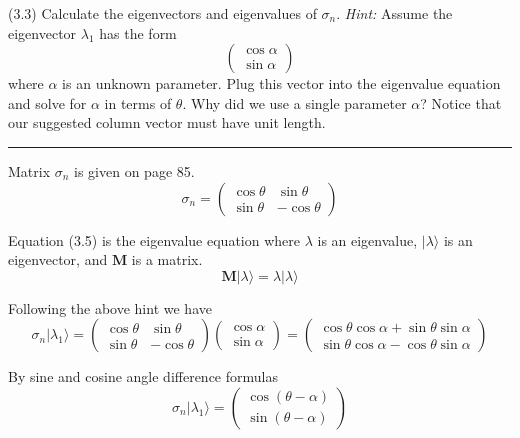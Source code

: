 \documentclass[12pt]{article}
\begin{document}
(3.3)
Calculate the eigenvectors and eigenvalues of $\sigma_n$.
{\it Hint:}
Assume the eigenvector $\lambda_1$ has the form
\begin{equation*}
\begin{pmatrix}\cos\alpha\\\sin\alpha\end{pmatrix}
\end{equation*}
where $\alpha$ is an unknown parameter.
Plug this vector into the eigenvalue equation and
solve for $\alpha$ in terms of $\theta$.
Why did we use a single parameter $\alpha$?
Notice that our suggested column vector must have unit length.

\bigskip
\hrule

\bigskip
Matrix $\sigma_n$ is given on page 85.
\begin{equation*}
\sigma_n=\begin{pmatrix}
\cos\theta & \sin\theta
\\
\sin\theta & -\cos\theta
\end{pmatrix}
\end{equation*}

Equation (3.5) is the eigenvalue equation where $\lambda$ is an eigenvalue,
$|\lambda\rangle$ is an eigenvector, and $\mathbf M$ is a matrix.
\begin{equation*}
\mathbf M|\lambda\rangle=\lambda|\lambda\rangle
\tag{3.5}
\end{equation*}

Following the above hint we have
\begin{equation*}
\sigma_n|\lambda_1\rangle=\begin{pmatrix}
\cos\theta & \sin\theta
\\
\sin\theta & -\cos\theta
\end{pmatrix}
\begin{pmatrix}\cos\alpha\\\sin\alpha\end{pmatrix}
=\begin{pmatrix}
\cos\theta\cos\alpha+\sin\theta\sin\alpha
\\
\sin\theta\cos\alpha-\cos\theta\sin\alpha
\end{pmatrix}
\end{equation*}

By sine and cosine angle difference formulas
\begin{equation*}
\sigma_n|\lambda_1\rangle
=\begin{pmatrix}
\cos(\theta-\alpha)
\\
\sin(\theta-\alpha)
\end{pmatrix}
\end{equation*}
\end{document}
